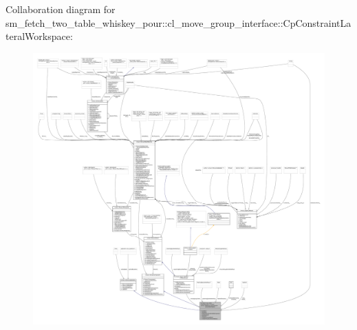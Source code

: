Collaboration diagram for sm\+\_\+fetch\+\_\+two\+\_\+table\+\_\+whiskey\+\_\+pour\+:\+:cl\+\_\+move\+\_\+group\+\_\+interface\+:\+:Cp\+Constraint\+Lateral\+Workspace\+:
\nopagebreak
\begin{figure}[H]
\begin{center}
\leavevmode
\includegraphics[width=350pt]{classsm__fetch__two__table__whiskey__pour_1_1cl__move__group__interface_1_1CpConstraintLateralWorkspace__coll__graph}
\end{center}
\end{figure}
